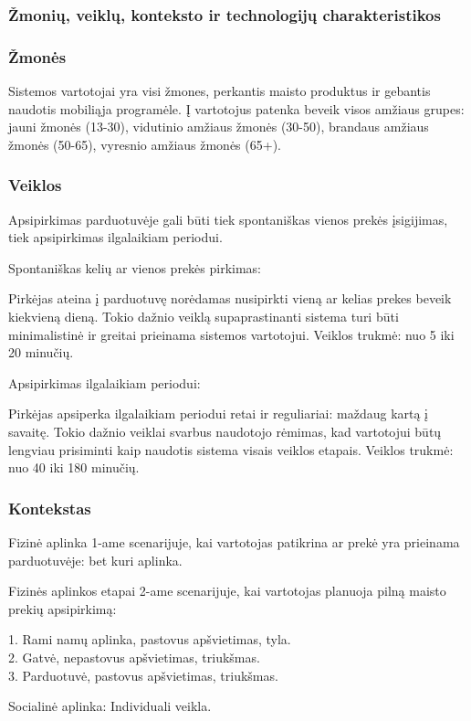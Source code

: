 \documentclass{article}
\begin{document}
\subsubsection{Žmonių, veiklų, konteksto ir technologijų charakteristikos}
\subsubsection*{Žmonės}
	Sistemos vartotojai yra visi žmones, perkantis maisto produktus ir gebantis naudotis mobiliąja programėle. Į vartotojus patenka beveik visos amžiaus grupes: jauni žmonės (13-30), vidutinio amžiaus žmonės (30-50), brandaus amžiaus žmonės (50-65), vyresnio amžiaus žmonės (65+). 
\subsubsection*{Veiklos}
		Apsipirkimas parduotuvėje gali būti tiek spontaniškas vienos prekės įsigijimas, tiek apsipirkimas ilgalaikiam periodui.\par
	Spontaniškas kelių ar vienos prekės pirkimas:\par
	Pirkėjas ateina į parduotuvę norėdamas nusipirkti vieną ar kelias prekes beveik kiekvieną dieną. Tokio dažnio veiklą supaprastinanti sistema turi būti minimalistinė ir greitai prieinama sistemos vartotojui. Veiklos trukmė: nuo 5 iki 20 minučių.\par
	Apsipirkimas ilgalaikiam periodui:\par 
	Pirkėjas apsiperka ilgalaikiam periodui retai ir reguliariai: maždaug kartą į savaitę. Tokio dažnio veiklai svarbus naudotojo rėmimas, kad vartotojui būtų lengviau prisiminti kaip naudotis sistema visais veiklos etapais. Veiklos trukmė: nuo 40 iki 180 minučių.
\subsubsection*{Kontekstas}
	Fizinė aplinka 1-ame scenarijuje, kai vartotojas patikrina ar prekė yra prieinama parduotuvėje: bet kuri aplinka.\par
	Fizinės aplinkos etapai 2-ame scenarijuje, kai vartotojas planuoja pilną maisto prekių apsipirkimą:\par
	1.	Rami namų aplinka, pastovus apšvietimas, tyla.\\
	2.	Gatvė, nepastovus apšvietimas, triukšmas.\\
	3.	Parduotuvė, pastovus apšvietimas, triukšmas.\par
	Socialinė aplinka: Individuali veikla.
\end{document}
